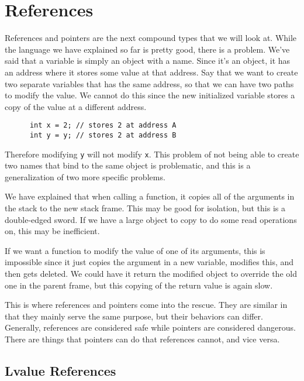 \documentclass{article}
\begin{document}
\section{References} 

    References and pointers are the next compound types that we will look at. While the language we have explained so far is pretty good, there is a problem. We've said that a variable is simply an object with a name. Since it's an object, it has an address where it stores some value at that address. Say that we want to create two separate variables that has the same address, so that we can have two paths to modify the value. We cannot do this since the new initialized variable stores a copy of the value at a different address. 
    \begin{lstlisting}
      int x = 2; // stores 2 at address A
      int y = y; // stores 2 at address B
    \end{lstlisting}
    Therefore modifying \texttt{y} will not modify \texttt{x}. This problem of not being able to create two names that bind to the same object is problematic, and this is a generalization of two more specific problems. 

    \begin{example}
      We have explained that when calling a function, it copies all of the arguments in the stack to the new stack frame. This may be good for isolation, but this is a double-edged sword. If we have a large object to copy to do some read operations on, this may be inefficient. 
    \end{example}

    \begin{example}
      If we want a function to modify the value of one of its arguments, this is impossible since it just copies the argument in a new variable, modifies this, and then gets deleted. We could have it return the modified object to override the old one in the parent frame, but this copying of the return value is again slow.   
    \end{example}

    This is where references and pointers come into the rescue. They are similar in that they mainly serve the same purpose, but their behaviors can differ. Generally, references are considered safe while pointers are considered dangerous. There are things that pointers can do that references cannot, and vice versa. 

  \subsection{Lvalue References}
  
\end{document}
